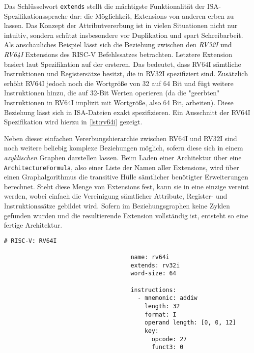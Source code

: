 Das Schlüsselwort \texttt{extends} stellt die mächtigste Funktionalität der
ISA-Spezifikationssprache dar: die Möglichkeit, Extensions von anderen erben zu
lassen. Das Konzept der Attributvererbung ist in vielen Situationen nicht nur
intuitiv, sondern schützt insbesondere vor Duplikation und spart Schreibarbeit.
Als anschauliches Beispiel lässt sich die Beziehung zwischen den \emph{RV32I}
und \emph{RV64I} Extensions des RISC-V Befehlssatzes betrachten. Letztere
Extension basiert laut Spezifikation auf der ersteren. Das bedeutet, dass RV64I
sämtliche Instruktionen und Registersätze besitzt, die in RV32I spezifiziert
sind. Zusätzlich erhöht RV64I jedoch noch die Wortgröße von 32 auf 64 Bit und
fügt weitere Instruktionen hinzu, die auf 32-Bit Werten operieren (da die
"geerbten" Instruktionen in RV64I implizit mit Wortgröße, also 64 Bit,
arbeiten). Diese Beziehung lässt sich in ISA-Dateien exakt spezifizieren. Ein
Ausschnitt der RV64I Spezifikation wird hierzu in \autoref{lst:rv64i} gezeigt.

Neben dieser einfachen Vererbungshierarchie zwischen RV64I und RV32I sind noch
weitere beliebig komplexe Beziehungen möglich, sofern diese sich in einem
\emph{azyklischen} Graphen darstellen lassen. Beim Laden einer Architektur über
eine \texttt{ArchitectureFormula}, also einer Liste der Namen aller Extensions,
wird über einen Graphalgorithmus die transitive Hülle sämtlicher benötigter
Erweiterungen berechnet. Steht diese Menge von Extensions fest, kann sie in eine
einzige vereint werden, wobei einfach die Vereinigung sämtlicher Attribute,
Register- und Instruktionssätze gebildet wird. Sofern im Beziehungsgraphen keine
Zyklen gefunden wurden und die resultierende Extension vollständig ist, entsteht
so eine fertige Architektur.

\begin{table}
\begin{lstlisting}[language=ISA]
                                    # RISC-V: RV64I

                                    name: rv64i
                                    extends: rv32i
                                    word-size: 64

                                    instructions:
                                      - mnemonic: addiw
                                        length: 32
                                        format: I
                                        operand length: [0, 0, 12]
                                        key:
                                          opcode: 27
                                          funct3: 0
\end{lstlisting}
\begin{lstlisting}[caption={Ein Ausschnitt der Definition der RV64I-Extension des RISC-V Befehlssatzes. Zur Vererbung der Attribute von RV32I benötigt es lediglich der Spezifikation der \texttt{extends} Klausel. Zusätzlich wird die Wortgröße sowie eine Hand voll weiterer Befehle neu definiert.}, label={lst:rv64i}]
\end{lstlisting}
\end{table}

